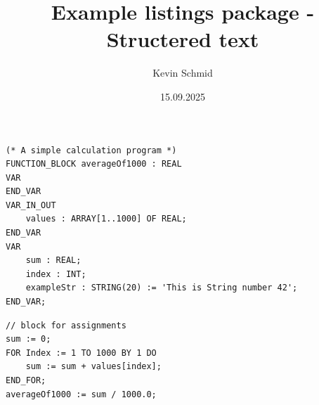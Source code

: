 \documentclass[12pt, a4paper, oneside]{scrreprt}
\title{Example listings package - Structered text}
\author{Kevin Schmid}
\date{15.09.2025}
\begin{document}
\begin{lstlisting}[language=ST, caption=function deklaration]
(* A simple calculation program *)
FUNCTION_BLOCK averageOf1000 : REAL
VAR
END_VAR
VAR_IN_OUT
	values : ARRAY[1..1000] OF REAL;
END_VAR
VAR
	sum : REAL;
	index : INT;
	exampleStr : STRING(20) := 'This is String number 42';
END_VAR;
\end{lstlisting}

\begin{lstlisting}[language=ST, caption=function block]
// block for assignments
sum := 0;
FOR Index := 1 TO 1000 BY 1 DO
	sum := sum + values[index];
END_FOR;
averageOf1000 := sum / 1000.0;
\end{lstlisting}
\end{document}
